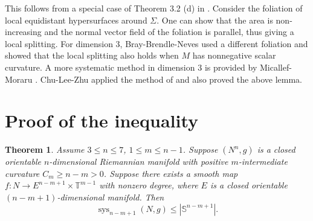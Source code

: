\documentclass[11pt]{amsart}
\newtheorem{theorem}{Theorem}[section]
\theoremstyle{definition}
\theoremstyle{remark}
\numberwithin{equation}{section}
\begin{document}
This follows from a special case of Theorem 3.2 (d) in \cite{heintze-karcher-submanifold}. Consider
  the foliation of local equidistant hypersurfaces around $\Sigma$. One can show that the area is
  non-increasing and the normal vector field of the foliation is parallel, thus giving a local
  splitting.  For dimension $3$, Bray-Brendle-Neves \cite{BrayBrenleNevesrigidity} used a different
  foliation and showed that the local splitting also holds when $M$ has nonnegative scalar
  curvature. A more systematic method in dimension $3$ is provided by Micallef-Moraru
  \cite{micallef-moraru-splitting}. Chu-Lee-Zhu \cite{chuleezhu_n_systole} applied the method of
  \cite{BrayBrenleNevesrigidity} and also proved the above lemma.





\section{Proof of the inequality}\label{section3}
    
    \begin{theorem}\label{vol inequality in Cm case}
    Assume \(3 \leq  n \leq  7\), \(1 \leq  m \leq  n-1\). Suppose $(N^{n},g)$ is a closed
      orientable $n$-dimensional Riemannian manifold with positive $m$-intermediate curvature
      $C_{m}\geq n-m>0$. Suppose there exists a smooth map
      $f:N\rightarrow E^{n-m+1}\times \mathbb{T}^{m-1}$ with nonzero degree, where $E$ is a closed
      orientable $(n-m+1)$-dimensional manifold. Then
    $$\operatorname{sys}_{n-m+1}(N,g)\leq  |\mathbb{S}^{n-m+1}|.$$ 
\end{theorem}
\end{document}
